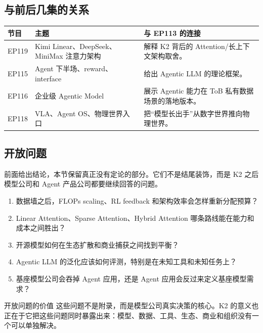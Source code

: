 \subsection{与前后几集的关系}

\begin{tabularx}{\textwidth}{p{}p{}X}
\toprule
节目 & 主题 & 与 EP113 的连接 \\
\midrule
EP119 & Kimi Linear、DeepSeek、MiniMax 注意力架构 & 解释 K2 背后的 Attention/长上下文架构取舍。 \\
EP115 & Agent 下半场、reward、interface & 给出 Agentic LLM 的理论框架。 \\
EP116 & 企业级 Agentic Model & 展示 Agentic 能力在 ToB 私有数据场景的落地版本。 \\
EP118 & VLA、Agent OS、物理世界入口 & 把“模型长出手”从数字世界推向物理世界。 \\
\bottomrule
\end{tabularx}

\subsection{开放问题}

前面给出结论，本节保留真正没有定论的部分。它们不是结尾装饰，而是 K2 之后模型公司和 Agent 产品公司都要继续回答的问题。

\begin{enumerate}
\item 数据墙之后，FLOPs scaling、RL feedback 和架构效率会怎样重新分配预算？
\item Linear Attention、Sparse Attention、Hybrid Attention 哪条路线能在能力和成本之间胜出？
\item 开源模型如何在生态扩散和商业捕获之间找到平衡？
\item Agentic LLM 的泛化应该如何评测，特别是在未知工具和未知任务上？
\item 基座模型公司会吞掉 Agent 应用，还是 Agent 应用会反过来定义基座模型需求？
\end{enumerate}

\begin{warningbox}{开放问题的价值}
这些问题不是附录，而是模型公司真实决策的核心。K2 的意义也正在于它把这些问题同时暴露出来：模型、数据、工具、生态、商业和组织没有一个可以单独解决。
\end{warningbox}

